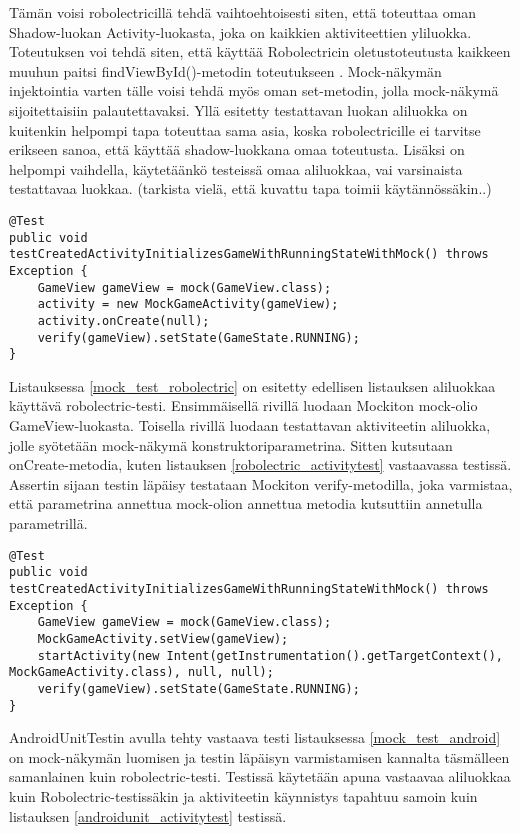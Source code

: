 Tämän voisi robolectricillä tehdä vaihtoehtoisesti siten, että toteuttaa oman Shadow-luokan Activity-luokasta, joka on kaikkien aktiviteettien yliluokka. Toteutuksen voi tehdä siten, että käyttää Robolectricin oletustoteutusta kaikkeen muuhun paitsi findViewById()-metodin toteutukseen \cite{robolectric}. Mock-näkymän injektointia varten tälle voisi tehdä myös oman set-metodin, jolla mock-näkymä sijoitettaisiin palautettavaksi. Yllä esitetty testattavan luokan aliluokka on kuitenkin helpompi tapa toteuttaa sama asia, koska robolectricille ei tarvitse erikseen sanoa, että käyttää shadow-luokkana omaa toteutusta. Lisäksi on helpompi vaihdella, käytetäänkö testeissä omaa aliluokkaa, vai varsinaista testattavaa luokkaa. (tarkista vielä, että kuvattu tapa toimii käytännössäkin..)

\begin{lstlisting}[float,label=mock_test_robolectric, caption=Mock-testi robolectrcicillä]
@Test
public void testCreatedActivityInitializesGameWithRunningStateWithMock() throws Exception {
	GameView gameView = mock(GameView.class);
	activity = new MockGameActivity(gameView);
	activity.onCreate(null);
	verify(gameView).setState(GameState.RUNNING);
}
\end{lstlisting}

Listauksessa \ref{mock_test_robolectric} on esitetty edellisen listauksen aliluokkaa käyttävä robolectric-testi. Ensimmäisellä rivillä luodaan Mockiton mock-olio GameView-luokasta. Toisella rivillä luodaan testattavan aktiviteetin aliluokka, jolle syötetään mock-näkymä konstruktoriparametrina. Sitten kutsutaan onCreate-metodia, kuten listauksen \ref{robolectric_activitytest} vastaavassa testissä. Assertin sijaan testin läpäisy testataan Mockiton verify-metodilla, joka varmistaa, että parametrina annettua mock-olion annettua metodia kutsuttiin annetulla parametrillä.

\begin{lstlisting}[float,label=mock_test_android, caption=Mock-testi androidunittestillä]
@Test
public void testCreatedActivityInitializesGameWithRunningStateWithMock() throws Exception {
	GameView gameView = mock(GameView.class);
	MockGameActivity.setView(gameView);
	startActivity(new Intent(getInstrumentation().getTargetContext(), MockGameActivity.class), null, null);
	verify(gameView).setState(GameState.RUNNING);
}
\end{lstlisting}

AndroidUnitTestin avulla tehty vastaava testi listauksessa \ref{mock_test_android} on mock-näkymän luomisen ja testin läpäisyn varmistamisen kannalta täsmälleen samanlainen kuin robolectric-testi. Testissä käytetään apuna vastaavaa aliluokkaa kuin Robolectric-testissäkin ja aktiviteetin käynnistys tapahtuu samoin kuin listauksen \ref{androidunit_activitytest} testissä.

